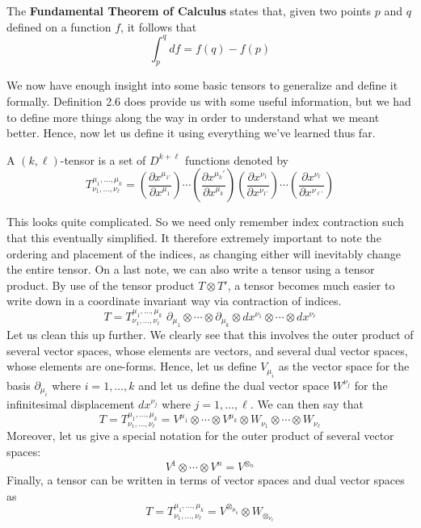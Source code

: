 \documentclass{article}
\begin{document}
 		\pagebreak
 			\begin{thm}
 				The \textbf{Fundamental Theorem of Calculus} states that, given two points $p$ and $q$ defined on a function $f$, it follows that
 				\begin{equation}
 					\label{eq:TheoremCalculus}
 					\boxed{\int_p^q df = f(q) - f(p)}
 				\end{equation}
 			\end{thm}
 			We now have enough insight into some basic tensors to generalize and define it formally. Definition 2.6 does provide us with some useful information, but we had to define more things along the way in order to understand what we meant better. Hence, now let us define it using everything we've learned thus far.
 			\begin{defn}
 				A $(k,\ell)$-tensor is a set of $D^{k+\ell}$ functions denoted by
 				$$ T_{\nu_1, \dots, \nu_\ell}^{\mu_1, \dots, \mu_k} = \left( \frac{\partial x^{\mu_{1'}}}{\partial x^{\mu_1}} \right) \cdots \left( \frac{\partial x^{\mu_k'}}{\partial x^{\mu_k}} \right)\left( \frac{\partial x^{\nu_1}}{\partial x^{\nu_{1'}}} \right) \cdots \left( \frac{\partial x^{\nu_\ell}}{\partial x^{\nu_{\ell'}}} \right) $$
 			\end{defn}
 			This looks quite complicated. So we need only remember index contraction such that this eventually simplified. It therefore extremely important to note the ordering and placement of the indices, as changing either will inevitably change the entire tensor. On a last note, we can also write a tensor using a tensor product.
 			By use of the tensor product $T \otimes T'$, a tensor becomes much easier to write down in a coordinate invariant way via contraction of indices.
 			$$ T = T_{\nu_1, \dots, \nu_\ell}^{\mu_1, \dots, \mu_k} \,\,  \partial_{\mu_1} \otimes \cdots \otimes \partial_{\mu_k} \otimes dx^{\nu_1} \otimes \cdots \otimes dx^{\nu_\ell} $$
 			Let us clean this up further. We clearly see that this involves the outer product of several vector spaces, whose elements are vectors, and several dual vector spaces, whose elements are one-forms. Hence, let us define $V_{\mu_i}$ as the vector space for the basis $\partial_{\mu_i}$ where $i=1,\dots, k$ and let us define the dual vector space $W^{\nu_j}$ for the infinitesimal displacement $dx^{\nu_j}$ where $j=1,\dots, \ell$. We can then say that
 			$$T = T_{\nu_1, \dots, \nu_\ell}^{\mu_1, \dots, \mu_k} = V^{\mu_1} \otimes \cdots \otimes V^{\mu_k} \otimes W_{\nu_1} \otimes \cdots \otimes W_{\nu_\ell} $$
 			Moreover, let us give a special notation for the outer product of several vector spaces:
 			$$ V^1 \otimes \cdots \otimes V^n = V^{\otimes_{n}}$$
 			Finally, a tensor can be written in terms of vector spaces and dual vector spaces as
 			$$T = T_{\nu_1, \dots, \nu_\ell}^{\mu_1, \dots, \mu_k}= V^{\otimes_{\mu_k}} \otimes W_{\otimes_{\nu_\ell}} $$
 			
\end{document}
